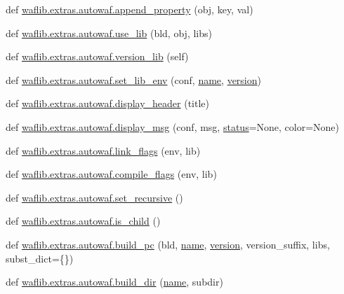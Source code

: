 \begin{DoxyCompactItemize}
def \hyperlink{namespacewaflib_1_1extras_1_1autowaf_afa6b6d171df50c28e7716ced53531c28}{waflib.\+extras.\+autowaf.\+append\+\_\+property} (obj, key, val)
\item 
def \hyperlink{namespacewaflib_1_1extras_1_1autowaf_a1e4b5ff71300f60a145698ab26652bbf}{waflib.\+extras.\+autowaf.\+use\+\_\+lib} (bld, obj, libs)
\item 
def \hyperlink{namespacewaflib_1_1extras_1_1autowaf_a754a91b58a248a1a3544336935ae3c97}{waflib.\+extras.\+autowaf.\+version\+\_\+lib} (self)
\item 
def \hyperlink{namespacewaflib_1_1extras_1_1autowaf_a01ed75513ca7e8dba61371b2c8436fb2}{waflib.\+extras.\+autowaf.\+set\+\_\+lib\+\_\+env} (conf, \hyperlink{lib_2expat_8h_a1b49b495b59f9e73205b69ad1a2965b0}{name}, \hyperlink{lib_2expat_8h_aec5db107b91447a96c47961ce9df2660}{version})
\item 
def \hyperlink{namespacewaflib_1_1extras_1_1autowaf_a681e2d13fe20ee08a9aedae3e3639559}{waflib.\+extras.\+autowaf.\+display\+\_\+header} (title)
\item 
def \hyperlink{namespacewaflib_1_1extras_1_1autowaf_a172925822ac841519e6d0cbf64db2763}{waflib.\+extras.\+autowaf.\+display\+\_\+msg} (conf, msg, \hyperlink{rfft2d_test_m_l_8m_a1b5437a866e6f95107b07ba845bc1800}{status}=None, color=None)
\item 
def \hyperlink{namespacewaflib_1_1extras_1_1autowaf_aae8dbef5afacdec7d2986e87310a9a65}{waflib.\+extras.\+autowaf.\+link\+\_\+flags} (env, lib)
\item 
def \hyperlink{namespacewaflib_1_1extras_1_1autowaf_a60d947e8bd1f3eedc65659dd397034e5}{waflib.\+extras.\+autowaf.\+compile\+\_\+flags} (env, lib)
\item 
def \hyperlink{namespacewaflib_1_1extras_1_1autowaf_a0c24e7747f55c7758eef2c21f9fc7c05}{waflib.\+extras.\+autowaf.\+set\+\_\+recursive} ()
\item 
def \hyperlink{namespacewaflib_1_1extras_1_1autowaf_ac1301a2a7a405a207c434e0be3130f7d}{waflib.\+extras.\+autowaf.\+is\+\_\+child} ()
\item 
def \hyperlink{namespacewaflib_1_1extras_1_1autowaf_a377bdb8d79f551ca4d0ff4866b046fe1}{waflib.\+extras.\+autowaf.\+build\+\_\+pc} (bld, \hyperlink{lib_2expat_8h_a1b49b495b59f9e73205b69ad1a2965b0}{name}, \hyperlink{lib_2expat_8h_aec5db107b91447a96c47961ce9df2660}{version}, version\+\_\+suffix, libs, subst\+\_\+dict=\{\})
\item 
def \hyperlink{namespacewaflib_1_1extras_1_1autowaf_a6cf22a96f4a27c7ae98a7adc1561bdb1}{waflib.\+extras.\+autowaf.\+build\+\_\+dir} (\hyperlink{lib_2expat_8h_a1b49b495b59f9e73205b69ad1a2965b0}{name}, subdir)

\end{DoxyCompactItemize}
